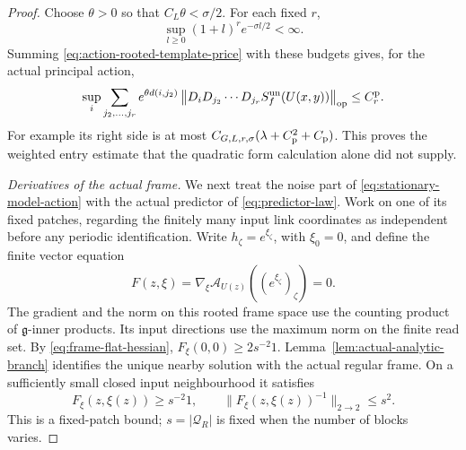 \documentclass[11pt,reqno]{amsart}
\numberwithin{equation}{section}
\theoremstyle{definition}
\theoremstyle{remark}
\newcommand{\g}{\mathfrak g}
\begin{document}
\begin{proof}
Choose \(\theta>0\) so that \(C_L\theta<\sigma/2\).
For each fixed \(r\),
\[
 \sup_{l\ge0}(1+l)^r e^{-\sigma l/2}<\infty.
\]
Summing \eqref{eq:action-rooted-template-price} with these
budgets gives, for the actual principal action,
\begin{equation}
 \sup_i\sum_{j_2,\ldots,j_r}e^{\theta d(i,j_2)}
       \left\|D_iD_{j_2}\cdots D_{j_r}
                      S_f^{\rm un}(U(x,y))\right\|_{\rm op}
                                                \le C_r^{\rm p}.
 \label{eq:action-principal-rooted-sums}
\end{equation}
For example its right side is at most
\(C_{G,L,r,\sigma}(\lambda+C_{\rm p}^2+C_{\rm p})\).
This proves the weighted entry estimate that the quadratic
form calculation alone did not supply.

\smallskip\noindent
\emph{Derivatives of the actual frame.}
We next treat the noise part of
\eqref{eq:stationary-model-action} with the actual predictor
of \eqref{eq:predictor-law}. Work on one of its fixed
patches, regarding the finitely many input link coordinates
as independent before any periodic identification. Write
\(h_\zeta=e^{\xi_\zeta}\), with \(\xi_0=0\), and define
the finite vector equation
\[
 F(z,\xi)=\nabla_\xi
                \mathcal A_{U(z)}((e^{\xi_\zeta})_\zeta)=0.
\]
The gradient and the norm on this rooted frame space use
the counting product of \(\g\)-inner products. Its input
directions use the maximum norm on the finite read set.
By \eqref{eq:frame-flat-hessian},
\(F_\xi(0,0)\ge2s^{-2}1\).
Lemma~\ref{lem:actual-analytic-branch} identifies the unique
nearby solution with the actual regular frame. On a
sufficiently small closed input neighbourhood it satisfies
\begin{equation}
             F_\xi(z,\xi(z))\ge s^{-2}1,
                 \qquad \|F_\xi(z,\xi(z))^{-1}\|_{2\to2}\le s^2.
 \label{eq:action-frame-inverse-price}
\end{equation}
This is a fixed-patch bound; \(s=|\mathcal Q_R|\) is fixed
when the number of blocks varies.


\end{proof}
\end{document}
